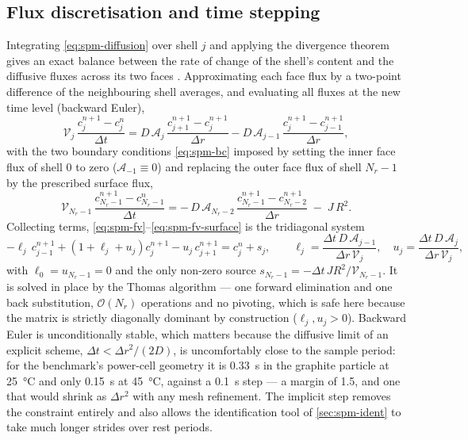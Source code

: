 \subsection{Flux discretisation and time stepping}
Integrating \eqref{eq:spm-diffusion} over shell $j$ and applying the divergence theorem gives an
exact balance between the rate of change of the shell's content and the diffusive fluxes across
its two faces \cite{patankar1980}. Approximating each face flux by a two-point difference of the
neighbouring shell averages, and evaluating all fluxes at the new time level (backward Euler),
\begin{equation}
\mathcal{V}_j\,\frac{c_j^{n+1}-c_j^{n}}{\Delta t}
 = D\,\mathcal{A}_j\,\frac{c_{j+1}^{n+1}-c_j^{n+1}}{\Delta r}
 - D\,\mathcal{A}_{j-1}\,\frac{c_j^{n+1}-c_{j-1}^{n+1}}{\Delta r},
\label{eq:spm-fv}
\end{equation}
with the two boundary conditions \eqref{eq:spm-bc} imposed by setting the inner face flux of
shell $0$ to zero ($\mathcal{A}_{-1}\equiv0$) and replacing the outer face flux of shell
$N_r-1$ by the prescribed surface flux,
\begin{equation}
\mathcal{V}_{N_r-1}\,\frac{c_{N_r-1}^{n+1}-c_{N_r-1}^{n}}{\Delta t}
 = -\,D\,\mathcal{A}_{N_r-2}\,\frac{c_{N_r-1}^{n+1}-c_{N_r-2}^{n+1}}{\Delta r}
   \;-\; J\,R^2 .
\label{eq:spm-fv-surface}
\end{equation}
Collecting terms, \eqref{eq:spm-fv}--\eqref{eq:spm-fv-surface} is the tridiagonal system
\begin{equation}
-\ell_j\,c_{j-1}^{n+1} + \left(1+\ell_j+u_j\right)c_j^{n+1} - u_j\,c_{j+1}^{n+1} = c_j^{n} + s_j,
\qquad
\ell_j = \frac{\Delta t\,D\,\mathcal{A}_{j-1}}{\Delta r\,\mathcal{V}_j},
\quad
u_j = \frac{\Delta t\,D\,\mathcal{A}_{j}}{\Delta r\,\mathcal{V}_j},
\label{eq:spm-tridiag}
\end{equation}
with $\ell_0 = u_{N_r-1} = 0$ and the only non-zero source $s_{N_r-1} = -\Delta t\,J R^2/\mathcal{V}_{N_r-1}$.
It is solved in place by the Thomas algorithm \cite{thomas1949,golubvanloan2013} --- one forward
elimination and one back substitution, $\mathcal{O}(N_r)$ operations and no pivoting, which is
safe here because the matrix is strictly diagonally dominant by construction ($\ell_j,u_j>0$).
Backward Euler is unconditionally stable, which matters because the diffusive limit of an
explicit scheme, $\Delta t < \Delta r^2/(2D)$, is uncomfortably close to the sample period: for
the benchmark's power-cell geometry it is \SI{0.33}{\second} in the graphite particle at
\SI{25}{\celsius} and only \SI{0.15}{\second} at \SI{45}{\celsius}, against a
\SI{0.1}{\second} step --- a margin of \num{1.5}, and one that would shrink as $\Delta r^2$ with
any mesh refinement. The implicit step removes the constraint entirely and also allows the
identification tool of \cref{sec:spm-ident} to take much longer strides over rest periods.

